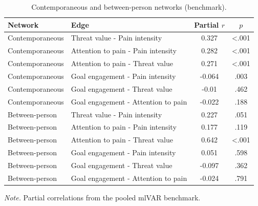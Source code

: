 \begin{table}[H]
\raggedright
\caption{Contemporaneous and between-person networks (benchmark).}
\label{tab:sup-contemporaneous-between}
\footnotesize
\begingroup
\setlength{\tabcolsep}{4pt}
\renewcommand{\arraystretch}{1.08}
\noindent
\begin{tabular*}{\textwidth}{@{\extracolsep{\fill}}llcc@{}}
\toprule
Network & Edge & Partial $r$ & $p$ \\
\midrule
Contemporaneous & Threat value - Pain intensity & 0.327 & <.001 \\
Contemporaneous & Attention to pain - Pain intensity & 0.282 & <.001 \\
Contemporaneous & Attention to pain - Threat value & 0.271 & <.001 \\
Contemporaneous & Goal engagement - Pain intensity & -0.064 & .003 \\
Contemporaneous & Goal engagement - Threat value & -0.01 & .462 \\
Contemporaneous & Goal engagement - Attention to pain & -0.022 & .188 \\
Between-person & Threat value - Pain intensity & 0.227 & .051 \\
Between-person & Attention to pain - Pain intensity & 0.177 & .119 \\
Between-person & Attention to pain - Threat value & 0.642 & <.001 \\
Between-person & Goal engagement - Pain intensity & 0.051 & .598 \\
Between-person & Goal engagement - Threat value & -0.097 & .362 \\
Between-person & Goal engagement - Attention to pain & -0.024 & .791 \\
\bottomrule
\end{tabular*}
\par\vspace{3pt}\noindent\parbox{\textwidth}{\footnotesize\textit{Note.} Partial correlations from the pooled mlVAR benchmark.}
\endgroup
\end{table}
